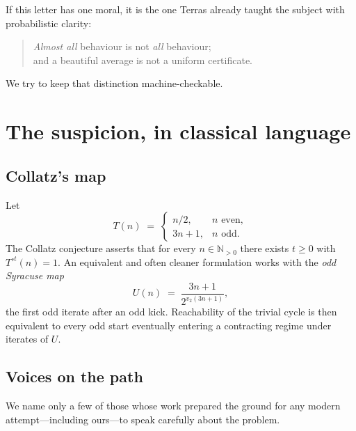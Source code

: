 \documentclass[11pt,a4paper]{article}
\theoremstyle{definition}
\theoremstyle{remark}
\newcommand{\Umap}{U}
\begin{document}
If this letter has one moral, it is the one Terras already taught the
subject with probabilistic clarity:
\begin{quote}
\emph{Almost all} behaviour is not \emph{all} behaviour;\\
and a beautiful average is not a uniform certificate.
\end{quote}
We try to keep that distinction machine-checkable.

\section{The suspicion, in classical language}

\subsection{Collatz's map}
Let
\[
  T(n) \;=\;
  \begin{cases}
    n/2, & n\text{ even},\\
    3n+1, & n\text{ odd}.
  \end{cases}
\]
The Collatz conjecture asserts that for every $n\in\mathbb{N}_{>0}$ there
exists $t\ge 0$ with $T^{\circ t}(n)=1$.
An equivalent and often cleaner formulation works with the
\emph{odd Syracuse map}
\[
  \Umap(n)
  \;=\;
  \frac{3n+1}{2^{v_2(3n+1)}},
\]
the first odd iterate after an odd kick.
Reachability of the trivial cycle is then equivalent to every odd start
eventually entering a contracting regime under iterates of $\Umap$.

\subsection{Voices on the path}
We name only a few of those whose work prepared the ground for any modern
attempt---including ours---to speak carefully about the problem.
\end{document}
